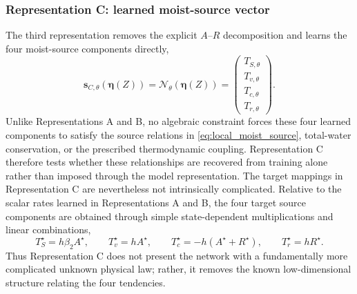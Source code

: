 \documentclass[12pt]{article}
\begin{document}
\subsubsection{Representation C: learned moist-source vector}
The third representation removes the explicit $A$--$R$ decomposition and
learns the four moist-source components directly,
\begin{equation}
	\mathbf{s}_{C,\theta}
	\!\left(\boldsymbol{\eta}(Z)\right)
	=
	\mathcal{N}_\theta
	\!\left(\boldsymbol{\eta}(Z)\right)
	=
	\begin{pmatrix}
		T_{S,\theta}\\
		T_{v,\theta}\\
		T_{c,\theta}\\
		T_{r,\theta}
	\end{pmatrix}.\label{eq:representation_C}
\end{equation}
Unlike Representations A and B, no algebraic constraint forces these four
learned components to satisfy the source relations in
\eqref{eq:local_moist_source}, total-water conservation, or the prescribed
thermodynamic coupling. Representation C therefore tests whether these
relationships are recovered from training alone rather than imposed through
the model representation. The target mappings in Representation C are nevertheless not intrinsically
complicated. Relative to the scalar rates learned in Representations A and B,
the four target source components are obtained through simple state-dependent
multiplications and linear combinations,
\begin{equation}
	T_S^\star = h\beta_2 A^\star,\qquad
	T_v^\star = hA^\star,\qquad
	T_c^\star = -h(A^\star+R^\star),\qquad
	T_r^\star = hR^\star.
\end{equation}
Thus Representation C does not present the network with a fundamentally more
complicated unknown physical law; rather, it removes the known low-dimensional
structure relating the four tendencies.
\end{document}
